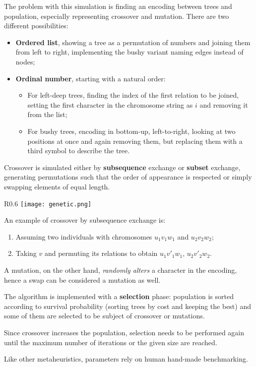 The problem with this simulation is finding an encoding between trees and population, especially representing crossover and mutation. There are two different possibilities: 
\begin{itemize}
	\item \textbf{Ordered list}, showing a tree as a permutation of numbers and joining them from left to right, implementing the bushy variant naming edges instead of nodes;
	\item \textbf{Ordinal number}, starting with a natural order:
	\begin{itemize}
		\item For left-deep trees, finding the index of the first relation to be joined, setting the first character in the chromosome string as $i$ and removing it from the list;
		\item For bushy trees, encoding in bottom-up, left-to-right, looking at two positions at once and again removing them, but replacing them with a third symbol to describe the tree.
	\end{itemize}
\end{itemize}
Crossover is simulated either by \textbf{subsequence} exchange or \textbf{subset} exchange, generating permutations such that the order of appearance is respected or simply swapping elements of equal length.

\begin{wrapfigure}{R}{0.6\textwidth}
	\vspace{-18pt}
	\texttt{[image: genetic.png]}
	\vspace{-60pt}
\end{wrapfigure}

An example of crossover by subsequence exchange is:
\begin{enumerate}
	\item Assuming two individuals with chromosomes $u_1v_1w_1$ and $u_2v_2w_2$;
	\item Taking $v$ and permuting its relations to obtain $u_1v'_1w_1$, $u_2v'_2w_2$.
\end{enumerate}

A mutation, on the other hand, \textit{randomly alters} a character in the encoding, hence a swap can be considered a mutation as well.

The algorithm is implemented with a \textbf{selection} phase: population is sorted according to survival probability (sorting trees by cost and keeping the best) and some of them are selected to be subject of crossover or mutations.

Since crossover increases the population, selection needs to be performed again until the maximum number of iterations or the given size are reached.

Like other metaheuristics, parameters rely on human hand-made benchmarking.
